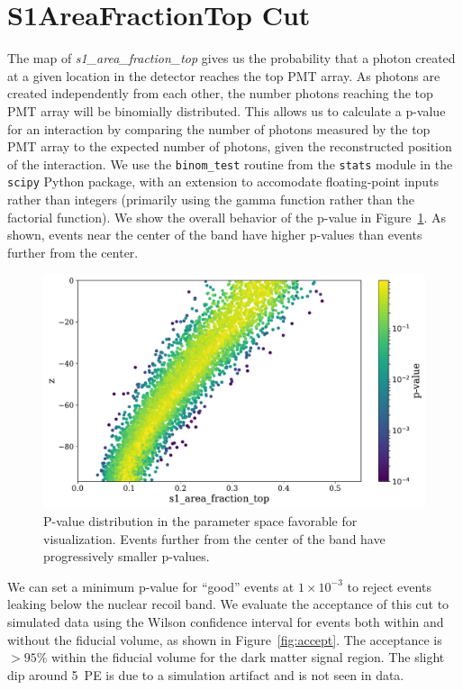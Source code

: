 \section{S1AreaFractionTop Cut}

The map of \textit{s1\_area\_fraction\_top} gives us the probability that a photon created at a given location in the detector reaches the top PMT array. As photons are created independently from each other, the number photons reaching the top PMT array will be binomially distributed. This allows us to calculate a p-value for an interaction by comparing the number of photons measured by the top PMT array to the expected number of photons, given the reconstructed position of the interaction. We use the \texttt{binom\_test} routine from the \texttt{stats} module in the \texttt{scipy} Python package, with an extension to accomodate floating-point inputs rather than integers (primarily using the gamma function rather than the factorial function). We show the overall behavior of the p-value in Figure~\ref{fig:z_aft_pval}. As shown, events near the center of the band have higher p-values than events further from the center.

\begin{figure}[htb]
\centering
    \includegraphics[width=\textwidth]{figures/s1aft/z_aft_pval}
    \caption{P-value distribution in the parameter space favorable for visualization. Events further from the center of the band have progressively smaller p-values.}\label{fig:z_aft_pval}
\end{figure}

We can set a minimum p-value for ``good'' events at $1\times10^{-3}$ to reject events leaking below the nuclear recoil band. We evaluate the acceptance of this cut to simulated data using the Wilson confidence interval for events both within and without the fiducial volume, as shown in Figure~\ref{fig:accept}. The acceptance is $>95\%$ within the fiducial volume for the dark matter signal region. The slight dip around 5~PE is due to a simulation artifact and is not seen in data.

